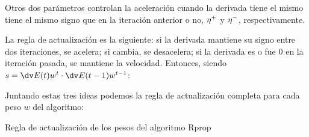 \begin{itemize}
Otros dos parámetros controlan la aceleración cuando la derivada tiene el mismo tiene el mismo signo que en la iteración anterior o no, $\eta^+$ y $\eta^-$, respectivamente. 

La regla de actualización es la siguiente: si la derivada mantiene su signo entre dos iteraciones, se acelera; si cambia, se desacelera; si la derivada es o fue $0$ en la iteración pasada, se mantiene la velocidad. Entonces, siendo $s=\multidv$:



\end{itemize}


Juntando estas tres ideas podemos la regla de actualización completa para cada peso $w$ del algoritmo:

\begin{algorithm}[H]
\caption{Regla de actualización de los pesos del algoritmo Rprop} 
\end{algorithm}

